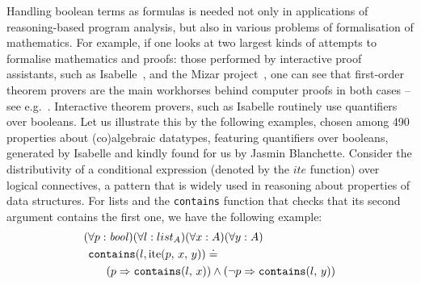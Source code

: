 Handling boolean terms as formulas is needed not only in applications of reasoning-based program analysis, but also in various problems of formalisation of mathematics.
For example, if one looks at two largest kinds of attempts to formalise mathematics and proofs: those performed by interactive proof assistants, such as Isabelle~\cite{Isabelle},  and the Mizar project~\cite{Mizar}, one can see that first-order theorem provers are the main workhorses behind computer proofs in both cases -- see e.g.~\cite{Sledgehammer,DBLP:conf/icms/UrbanHV10}.
Interactive theorem provers, such as Isabelle routinely use quantifiers over booleans.  Let us illustrate this by the
following examples, chosen among 490 properties about (co)algebraic datatypes, featuring quantifiers over booleans, generated by Isabelle and kindly found for us by Jasmin Blanchette. Consider the distributivity of a conditional expression (denoted by the $\mathit{ite}$ function) over logical connectives, a pattern that is widely used in reasoning about properties of data structures. For lists and the \lstinline'contains' function that checks that its second argument contains the first one, we have the following example:
\begin{gather}\label{formula:contains}
  \begin{aligned}
&(\forall{{p}:{\mathit{bool}}})(\forall{{l}:{list_A}})(\forall{{x}:{A}})(\forall{{y}:{A}}) \\
&\hspace{0.4em}\mathtt{contains}(l,\mathrm{ite}(p,\,x,\,y)) \doteq \\
&\hspace{2em} (p \Rightarrow \mathtt{contains}(l,\,x)) \wedge (\neg p \Rightarrow \mathtt{contains}(l,\,y))
 \end{aligned}
\end{gather}

